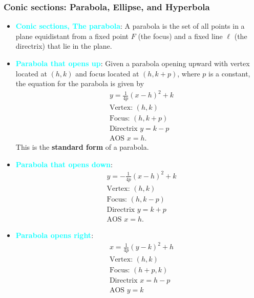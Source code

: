 \documentclass{report}
\begin{document}
    \subsubsection{Conic sections: Parabola, Ellipse, and Hyperbola}
    \begin{itemize}
    \item \textbf{\textcolor{cyan}{Conic sections, The parabola}}:
      A parabola is the set of all points in a plane equidistant from a fixed point $F$ (the focus) and a fixed line $\ell$ (the directrix) that lie in the plane.
    \item \textbf{\textcolor{cyan}{Parabola that opens up}}:
        Given a parabola opening upward with vertex located at  $(h,k)$ and focus located at  $(h,k+p)$, where $p$ is a constant, the equation for the parabola is given by
        \begin{align*}
            &y= \frac{1}{4p}(x-h)^{2} + k \\
              &\text{Vertex: } (h,k) \\
              &\text{Focus: } (h,k+p) \\
              &\text{Directrix } y = k-p \\
              &\text{AOS } x=h
        .\end{align*}
        This is the \textbf{standard form} of a parabola.
        \bigbreak \noindent 
    \item \textbf{\textcolor{cyan}{Parabola that opens down}}:
        \begin{align*}
            &y = -\frac{1}{4p}(x-h)^{2} + k \\
              &\text{Vertex: } (h,k) \\
              &\text{Focus: } (h,k-p) \\
              &\text{Directrix } y = k+p \\
              &\text{AOS } x=h
        .\end{align*}
        \bigbreak \noindent 
    \item \textbf{\textcolor{cyan}{Parabola opens right}}:
        \begin{align*}
            &x= \frac{1}{4p}(y-k)^{2} + h \\
            &\text{Vertex: } (h,k) \\
            &\text{Focus: } (h+p,k) \\
            &\text{Directrix } x=h-p \\
            &\text{AOS } y=k

\end{align*}
\end{itemize}
\end{document}
